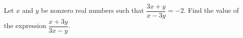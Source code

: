 Let $x$ and $y$ be nonzero real numbers such that $\dfrac{3x+y}{x-3y}=-2$. Find the value of the expression $\dfrac{x+3y}{3x-y}$.
